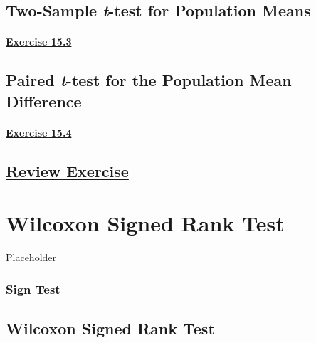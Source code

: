 \documentclass[
  11pt,
]{book}
\begin{document}
\section{\texorpdfstring{Two-Sample \textit{t}-test for Population Means}{Two-Sample -test for Population Means}}\label{two-sample--test-for-population-means-1}

\subsubsection*{\texorpdfstring{\hyperref[ex153a]{Exercise 15.3}}{Exercise 15.3}}\label{exercise-15.3}

\section{\texorpdfstring{Paired \textit{t}-test for the Population Mean Difference}{Paired -test for the Population Mean Difference}}\label{paired--test-for-the-population-mean-difference}

\subsubsection*{\texorpdfstring{\hyperref[ex154a]{Exercise 15.4}}{Exercise 15.4}}\label{exercise-15.4}

\section*{\texorpdfstring{\hyperref[re15a]{Review Exercise}}{Review Exercise}}\label{review-exercise-14}

\chapter{Wilcoxon Signed Rank Test}\label{wilcoxon-signed-rank-test}

Placeholder

\subsection*{Sign Test}\label{sign-test}

\section{Wilcoxon Signed Rank Test}\label{wilcoxon-signed-rank-test-1}
\end{document}
